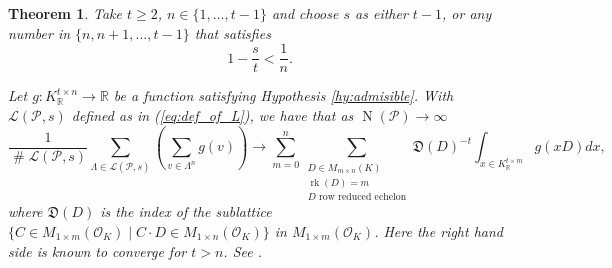 \documentclass{amsart}
\newtheorem{theorem}{Theorem}
\DeclareMathOperator{\card}{\texttt{\#}}
\DeclareMathOperator{\rank}{rk}
\DeclareMathOperator{\N}{N}
\begin{document}
\begin{theorem}
\label{th:higher_moments}
Take $t \ge 2$, $n \in \{1,\dots,t-1\}$ and choose $s$ as either $t-1$, or any number in $\{n,n+1,\dots,t-1\}$ that satisfies
\begin{equation}
1-\frac{s}{t} < \frac{1}{n}.
\end{equation}

Let $g:K_{\mathbb{R}}^{t \times n} \rightarrow \mathbb{R}$ be a function satisfying Hypothesis \ref{hy:admisible}. With $\mathcal{L}(\mathcal{P},s)$ defined as in (\ref{eq:def_of_L}), we have that as $\N(\mathcal{P}) \rightarrow \infty$
{\small \begin{equation}
\frac{1}{\card \mathcal{L}(\mathcal{P},s)} 
\sum_{ \Lambda \in \mathcal{L}(\mathcal{P},s)} 
\left( \sum_{v \in \Lambda^{n}} g(v)\right)
\rightarrow
\sum_{m=0}^{{n}}\sum_{\substack{D \in M_{m \times n }(K) \\ 
\rank(D) = m \\ 
D \text{ row reduced echelon}}}
\mathfrak{D}(D)^{-t} \int_{x \in K_\mathbb{R}^{t \times m }} g(x D ) dx,
\label{eq:right_side_converge}
\end{equation}}
where $\mathfrak{D}(D)$ is the index of the sublattice $\{ C \in M_{1 \times m }(\mathcal{O}_K) \mid C \cdot D \in M_{1 \times n}(\mathcal{O}_K)\}$ in $M_{1 \times m}(\mathcal{O}_K)$. 
Here the right hand side is known to converge for $t>n$. See \cite{GSV23}.
\end{theorem}
\end{document}
